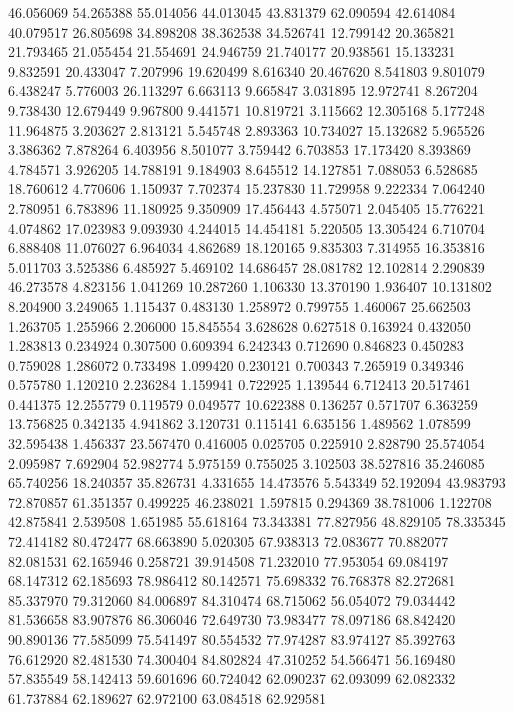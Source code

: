 46.056069
54.265388
55.014056
44.013045
43.831379
62.090594
42.614084
40.079517
26.805698
34.898208
38.362538
34.526741
12.799142
20.365821
21.793465
21.055454
21.554691
24.946759
21.740177
20.938561
15.133231
9.832591
20.433047
7.207996
19.620499
8.616340
20.467620
8.541803
9.801079
6.438247
5.776003
26.113297
6.663113
9.665847
3.031895
12.972741
8.267204
9.738430
12.679449
9.967800
9.441571
10.819721
3.115662
12.305168
5.177248
11.964875
3.203627
2.813121
5.545748
2.893363
10.734027
15.132682
5.965526
3.386362
7.878264
6.403956
8.501077
3.759442
6.703853
17.173420
8.393869
4.784571
3.926205
14.788191
9.184903
8.645512
14.127851
7.088053
6.528685
18.760612
4.770606
1.150937
7.702374
15.237830
11.729958
9.222334
7.064240
2.780951
6.783896
11.180925
9.350909
17.456443
4.575071
2.045405
15.776221
4.074862
17.023983
9.093930
4.244015
14.454181
5.220505
13.305424
6.710704
6.888408
11.076027
6.964034
4.862689
18.120165
9.835303
7.314955
16.353816
5.011703
3.525386
6.485927
5.469102
14.686457
28.081782
12.102814
2.290839
46.273578
4.823156
1.041269
10.287260
1.106330
13.370190
1.936407
10.131802
8.204900
3.249065
1.115437
0.483130
1.258972
0.799755
1.460067
25.662503
1.263705
1.255966
2.206000
15.845554
3.628628
0.627518
0.163924
0.432050
1.283813
0.234924
0.307500
0.609394
6.242343
0.712690
0.846823
0.450283
0.759028
1.286072
0.733498
1.099420
0.230121
0.700343
7.265919
0.349346
0.575780
1.120210
2.236284
1.159941
0.722925
1.139544
6.712413
20.517461
0.441375
12.255779
0.119579
0.049577
10.622388
0.136257
0.571707
6.363259
13.756825
0.342135
4.941862
3.120731
0.115141
6.635156
1.489562
1.078599
32.595438
1.456337
23.567470
0.416005
0.025705
0.225910
2.828790
25.574054
2.095987
7.692904
52.982774
5.975159
0.755025
3.102503
38.527816
35.246085
65.740256
18.240357
35.826731
4.331655
14.473576
5.543349
52.192094
43.983793
72.870857
61.351357
0.499225
46.238021
1.597815
0.294369
38.781006
1.122708
42.875841
2.539508
1.651985
55.618164
73.343381
77.827956
48.829105
78.335345
72.414182
80.472477
68.663890
5.020305
67.938313
72.083677
70.882077
82.081531
62.165946
0.258721
39.914508
71.232010
77.953054
69.084197
68.147312
62.185693
78.986412
80.142571
75.698332
76.768378
82.272681
85.337970
79.312060
84.006897
84.310474
68.715062
56.054072
79.034442
81.536658
83.907876
86.306046
72.649730
73.983477
78.097186
68.842420
90.890136
77.585099
75.541497
80.554532
77.974287
83.974127
85.392763
76.612920
82.481530
74.300404
84.802824
47.310252
54.566471
56.169480
57.835549
58.142413
59.601696
60.724042
62.090237
62.093099
62.082332
61.737884
62.189627
62.972100
63.084518
62.929581
